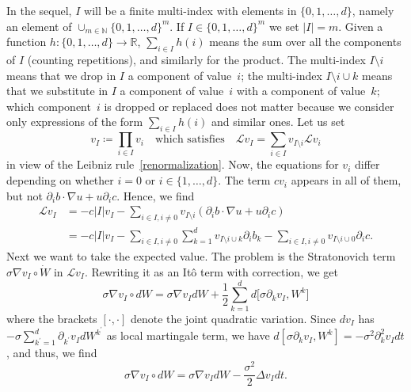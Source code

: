 \documentclass[a4paper,10pt]{article}
\newcommand\1{\mathbbm{1}}
\numberwithin{equation}{section}
\begin{document}
In the sequel, $I$ will be a finite multi-index with elements in $\{0,1,\ldots,d\}$, namely an element of $\cup_{m\in\mathbb{N}}\{0,1,\ldots, d\}^{m}$. If $I\in\{0,1,\ldots, d\}^{m}$ we set $\left\vert I\right\vert =m$. Given a function $h \colon \{0,1,\ldots, d\}\rightarrow\mathbb{R}$, $\sum_{i\in I}h(i)$ means the sum over all the components of $I$ (counting repetitions), and similarly for the product. The multi-index $I\setminus i$ means that we drop in $I$ a component of value~$i$; the multi-index $I\setminus i\cup k$ means that we substitute in $I$ a component of value~$i$ with a component of value~$k$; which component~$i$ is dropped or replaced does not matter because we consider only expressions of the form $\sum_{i\in I}h(i)$ and similar ones. Let us set
\begin{equation*}
v_{I}\coloneqq \prod_{i\in I}v_{i} \quad \text{which satisfies} \quad \mathcal{L}v_{I}=\sum_{i\in I}v_{I\setminus i}\mathcal{L}v_{i}
\end{equation*}
in view of the Leibniz rule~\eqref{renormalization}. Now, the equations for $v_{i}$ differ depending on whether $i=0$ or $i \in \{1,\ldots,d\}$. The
term $cv_{i}$ appears in all of them, but not $\partial_{i}b\cdot\nabla
u+u\partial_{i}c$. Hence, we find 
\begin{align*}
\mathcal{L}v_{I}  &  =-c\left\vert I\right\vert v_{I}-\sum_{i\in I,i\neq
0}v_{I\setminus i}(\partial_{i}b\cdot\nabla u+u\partial_{i}c) \\
&  =-c\left\vert I\right\vert v_{I}-\sum_{i\in I,i\neq0}\sum_{k=1} 
^{d}v_{I\setminus i\cup k}\partial_{i}b_{k}-\sum_{i\in I,i\neq0}v_{I\setminus
i\cup0}\partial_{i}c.
\end{align*}
Next we want to take the expected value. The problem is the Stratonovich term $\sigma\nabla
v_{I}\circ\dot{W}$ in $\mathcal{L}v_{I}$. Rewriting it as an  It\^{o} term with correction, we get 
\begin{equation*}
\sigma\nabla v_{I}\circ dW=\sigma\nabla v_{I}dW+\frac{1}{2}\sum_{k=1} 
^{d}d\big[  \sigma\partial_{k}v_{I},W^{k}\big]
\end{equation*}
where the brackets $[\cdot,\cdot]$ denote the joint quadratic variation. Since $dv_{I}$ has $-\sigma\sum_{k^{\prime}=1}^{d}\partial_{k^{\prime}} v_{I}dW^{k^{\prime}}$ as local martingale term, we have $d[\sigma\partial_{k}v_{I},W^{k}]=-\sigma^{2}\partial_{k}^{2}v_{I}dt$, and thus, we find
\begin{equation*}
\sigma\nabla v_{I}\circ dW=\sigma\nabla v_{I}dW-\frac{\sigma^{2}}{2}\Delta
v_{I}dt.
\end{equation*}
\end{document}
